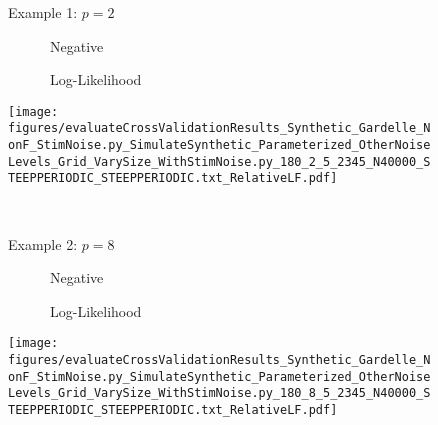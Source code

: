 \documentclass[si.tex]{subfiles}
\begin{document}
\begin{figure}
\centering

Example 1: $p=2$



\begin{minipage}[c]{0.8\linewidth}

\end{minipage}
\begin{minipage}[c]{0.19\linewidth}
\centering

\ \ \ \ \ \ Negative

\ \ \ \ \ \ Log-Likelihood

\texttt{[image: figures/evaluateCrossValidationResults\_Synthetic\_Gardelle\_NonF\_StimNoise.py\_SimulateSynthetic\_Parameterized\_OtherNoiseLevels\_Grid\_VarySize\_WithStimNoise.py\_180\_2\_5\_2345\_N40000\_STEEPPERIODIC\_STEEPPERIODIC.txt\_RelativeLF.pdf]}
\end{minipage}

\ 



Example 2: $p=8$



\begin{minipage}[c]{0.8\linewidth}

\end{minipage}
\begin{minipage}[c]{0.19\linewidth}
\centering

\ \ \ \ \ \ Negative

\ \ \ \ \ \ Log-Likelihood

\texttt{[image: figures/evaluateCrossValidationResults\_Synthetic\_Gardelle\_NonF\_StimNoise.py\_SimulateSynthetic\_Parameterized\_OtherNoiseLevels\_Grid\_VarySize\_WithStimNoise.py\_180\_8\_5\_2345\_N40000\_STEEPPERIODIC\_STEEPPERIODIC.txt\_RelativeLF.pdf]}
\end{minipage}



\end{figure}
\end{document}
